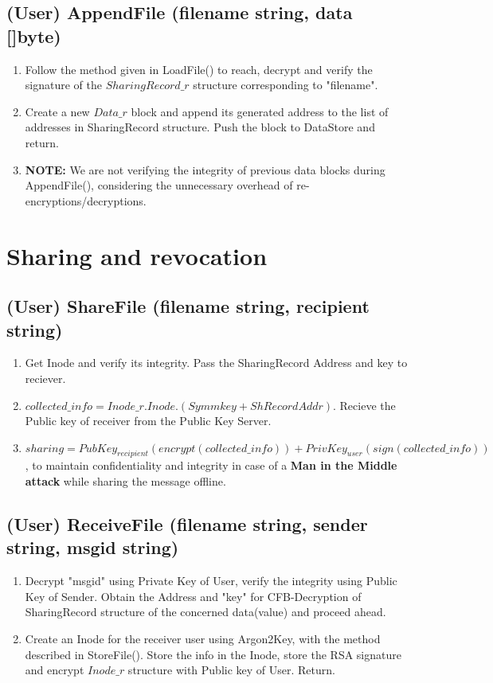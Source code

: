 \documentclass[a4paper, 12pt]{scrartcl}
\begin{document}
\subsection{(User) AppendFile (filename string, data []byte)}
\begin{enumerate}
	\itemsep0em
	\item Follow the method given in LoadFile() to reach, decrypt and verify the signature of the $SharingRecord\_r$ structure corresponding to "filename". 
	\item Create a new $Data\_r$ block and append its generated address to the list of addresses in SharingRecord structure. Push the block to DataStore and return.
	\item \textbf{NOTE:} We are not verifying the integrity of previous data blocks during AppendFile(), considering the unnecessary overhead of re-encryptions/decryptions.
\end{enumerate}

\section{Sharing and revocation}

\subsection{(User) ShareFile (filename string, recipient string)}
\begin{enumerate}
	\itemsep0em
	\item Get Inode and verify its integrity. Pass the SharingRecord Address and key to reciever. 
	\item $collected\_info = Inode\_r.Inode.(Symmkey + ShRecordAddr)$. Recieve the Public key of receiver from the Public Key Server.
	\item $sharing = PubKey_{recipient}(encrypt(collected\_info)) + PrivKey_{user}(sign(collected\_info))$, to maintain confidentiality and integrity in case of a \textbf{Man in the Middle attack} while sharing the message offline. 
\end{enumerate}

\subsection{(User) ReceiveFile (filename string, sender string, msgid string)}
\begin{enumerate}
	\itemsep0em
	\item Decrypt "msgid" using Private Key of User, verify the integrity using Public Key of Sender. Obtain the Address and "key" for CFB-Decryption of SharingRecord structure of the concerned data(value) and proceed ahead.
	\item Create an Inode for the receiver user using Argon2Key, with the method described in StoreFile(). Store the info in the Inode, store the RSA signature and encrypt $Inode\_r$ structure with Public key of User. Return.
\end{enumerate}
\end{document}
